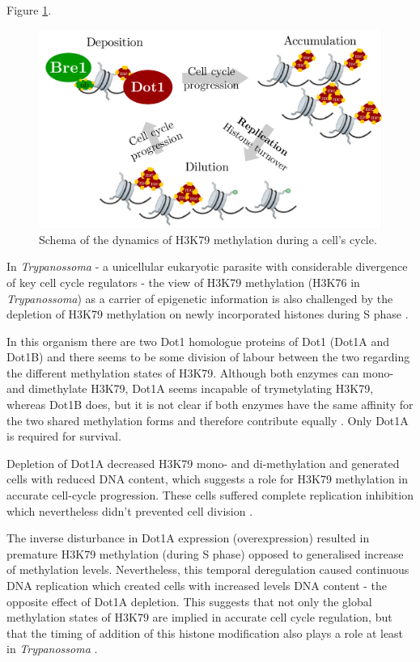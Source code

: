 \documentclass[11pt,twoside,a4paper]{report}
\begin{document}
		Figure \ref{fig:dot1_k79}.
		
		\begin{figure}[here]
			\centering
			\includegraphics[width=0.9\linewidth]{pngs/dot1_k79.png}
			\caption{Schema of the dynamics of H3K79 methylation during a cell's cycle.}
			\label{fig:dot1_k79}
		\end{figure}
		
		In \textit{Trypanossoma} - a unicellular eukaryotic parasite with considerable divergence of key cell cycle regulators - the view of H3K79 methylation (H3K76 in \textit{Trypanossoma}) as a carrier of epigenetic information is also challenged by the depletion of H3K79 methylation on newly incorporated histones during S phase \cite{Gassen2012}.
		
		In this organism there are two Dot1 homologue proteins of Dot1 (Dot1A and Dot1B) and there seems to be some division of labour between the two regarding the different methylation states of H3K79. Although both enzymes can mono- and dimethylate H3K79, Dot1A seems incapable of trymetylating H3K79, whereas Dot1B does, but it is not clear if both enzymes have the same affinity for the two shared methylation forms and therefore contribute equally \cite{Gassen2012}. Only Dot1A is required for survival.
	
		Depletion of Dot1A decreased H3K79 mono- and di-methylation and generated cells with reduced DNA content, which suggests a role for H3K79 methylation in accurate cell-cycle progression. These cells suffered complete replication inhibition which nevertheless didn't prevented cell division \cite{Gassen2012}.
		
		The inverse disturbance in Dot1A expression (overexpression) resulted in premature H3K79 methylation (during S phase) opposed to generalised increase of methylation levels. Nevertheless, this temporal deregulation caused continuous DNA replication which created cells with increased levels DNA content - the opposite effect of Dot1A depletion. This suggests that not only the global methylation states of H3K79 are implied in accurate cell cycle regulation, but that the timing of addition of this histone modification also plays a role at least in \textit{Trypanossoma} \cite{Gassen2012}.
		
\end{document}
